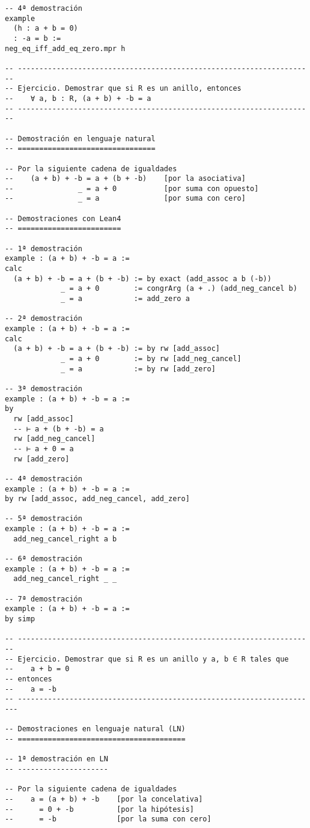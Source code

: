 \begin{verbatim}
-- 4ª demostración
example
  (h : a + b = 0)
  : -a = b :=
neg_eq_iff_add_eq_zero.mpr h

-- ---------------------------------------------------------------------
-- Ejercicio. Demostrar que si R es un anillo, entonces
--    ∀ a, b : R, (a + b) + -b = a
-- ---------------------------------------------------------------------

-- Demostración en lenguaje natural
-- ================================

-- Por la siguiente cadena de igualdades
--    (a + b) + -b = a + (b + -b)    [por la asociativa]
--               _ = a + 0           [por suma con opuesto]
--               _ = a               [por suma con cero]

-- Demostraciones con Lean4
-- ========================

-- 1ª demostración
example : (a + b) + -b = a :=
calc
  (a + b) + -b = a + (b + -b) := by exact (add_assoc a b (-b))
             _ = a + 0        := congrArg (a + .) (add_neg_cancel b)
             _ = a            := add_zero a

-- 2ª demostración
example : (a + b) + -b = a :=
calc
  (a + b) + -b = a + (b + -b) := by rw [add_assoc]
             _ = a + 0        := by rw [add_neg_cancel]
             _ = a            := by rw [add_zero]

-- 3ª demostración
example : (a + b) + -b = a :=
by
  rw [add_assoc]
  -- ⊢ a + (b + -b) = a
  rw [add_neg_cancel]
  -- ⊢ a + 0 = a
  rw [add_zero]

-- 4ª demostración
example : (a + b) + -b = a :=
by rw [add_assoc, add_neg_cancel, add_zero]

-- 5ª demostración
example : (a + b) + -b = a :=
  add_neg_cancel_right a b

-- 6ª demostración
example : (a + b) + -b = a :=
  add_neg_cancel_right _ _

-- 7ª demostración
example : (a + b) + -b = a :=
by simp

-- ---------------------------------------------------------------------
-- Ejercicio. Demostrar que si R es un anillo y a, b ∈ R tales que
--    a + b = 0
-- entonces
--    a = -b
-- ----------------------------------------------------------------------

-- Demostraciones en lenguaje natural (LN)
-- =======================================

-- 1ª demostración en LN
-- ---------------------

-- Por la siguiente cadena de igualdades
--    a = (a + b) + -b    [por la concelativa]
--      = 0 + -b          [por la hipótesis]
--      = -b              [por la suma con cero]


\end{verbatim}
